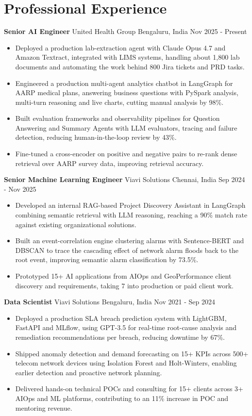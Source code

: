 \documentclass[10pt,a4paper]{article}
\newcommand{\role}[4]{\textbf{#1} \textbar{} #2 \hfill #3 \textbar{} #4\par}
\begin{document}
\section{Professional Experience}
\role{Senior AI Engineer}{United Health Group}{Bengaluru, India}{Nov 2025 - Present}
\begin{itemize}
  \item Deployed a production lab-extraction agent with Claude Opus 4.7 and Amazon Textract, integrated with LIMS systems, handling about 1,800 lab documents and automating the work behind 800 Jira tickets and PRD tasks.
  \item Engineered a production multi-agent analytics chatbot in LangGraph for AARP medical plans, answering business questions with PySpark analysis, multi-turn reasoning and live charts, cutting manual analysis by 98\%.
  \item Built evaluation frameworks and observability pipelines for Question Answering and Summary Agents with LLM evaluators, tracing and failure detection, reducing human-in-the-loop review by 43\%.
  \item Fine-tuned a cross-encoder on positive and negative pairs to re-rank dense retrieval over AARP survey data, improving retrieval accuracy.
\end{itemize}
\vspace{3pt}
\role{Senior Machine Learning Engineer}{Viavi Solutions}{Chennai, India}{Sep 2024 - Nov 2025}
\begin{itemize}
  \item Developed an internal RAG-based Project Discovery Assistant in LangGraph combining semantic retrieval with LLM reasoning, reaching a 90\% match rate against existing organizational solutions.
  \item Built an event-correlation engine clustering alarms with Sentence-BERT and DBSCAN to trace the cascading effect of network alarm floods back to the root event, improving semantic alarm classification by 73.5\%.
  \item Prototyped 15+ AI applications from AIOps and GeoPerformance client discovery and requirements, taking 7 into production or paid client work.
\end{itemize}
\vspace{3pt}
\role{Data Scientist}{Viavi Solutions}{Bengaluru, India}{Nov 2021 - Sep 2024}
\begin{itemize}
  \item Deployed a production SLA breach prediction system with LightGBM, FastAPI and MLflow, using GPT-3.5 for real-time root-cause analysis and remediation recommendations per breach, reducing downtime by 67\%.
  \item Shipped anomaly detection and demand forecasting on 15+ KPIs across 500+ telecom network devices using Isolation Forest and Holt-Winters, enabling earlier detection and proactive network planning.
  \item Delivered hands-on technical POCs and consulting for 15+ clients across 3+ AIOps and ML platforms, contributing to an 11\% increase in POC and mentoring revenue.
\end{itemize}
\end{document}
